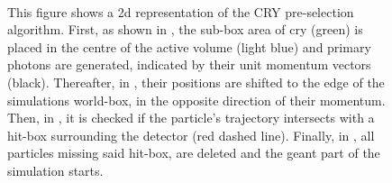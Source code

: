 \begin{figure}[htbp]
    \centering
    \\
    \caption[2D Representation of the CRY Pre-Selection Algorithm]{This figure shows a \Gls{2d} representation of the CRY pre-selection algorithm. First, as shown in , the sub-box area of \gls{cry} (green) is placed in the centre of the active volume (light blue) and primary photons are generated, indicated by their unit momentum vectors (black). Thereafter, in , their positions are shifted to the edge of the simulations world-box, in the opposite direction of their momentum. Then, in , it is checked if the particle's trajectory intersects with a hit-box surrounding the detector (red dashed line). Finally, in , all particles missing said hit-box, are deleted and the \gls{geant} part of the simulation starts.}
    \label{fig:CRYHitbox}
\end{figure}

